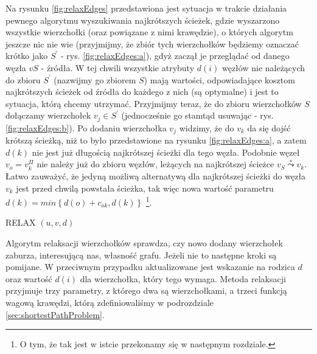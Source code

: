 Na rysunku \ref{fig:relaxEdges} przedstawiona jest sytuacja w trakcie działania pewnego algorytmu wyszukiwania najkrótszych ścieżek, gdzie wyszarzono wszystkie wierzchołki (oraz powiązane z nimi krawędzie), o których algorytm jeszcze nic nie wie (przyjmijmy, że zbiór tych wierzchołków będziemy oznaczać krótko jako $S^{'}$ - rys. \ref{fig:relaxEdges:a}), gdyż zaczął je przeglądać od danego węzła $v{S}$ - źródła. W tej chwili wszystkie atrybuty $d \left( i \right)$ węzłów nie należących do zbioru $S^{'}$ (nazwijmy go zbiorem $S$) mają wartości, odpowiadające kosztom najkrótszych ścieżek od źródła do każdego z nich (są optymalne) i jest to sytuacja, którą chcemy utrzymać. Przyjmijmy teraz, że do zbioru wierzchołków $S$ dołączamy wierzchołek $v_{j} \in S^{'}$ (jednocześnie go stamtąd usuwając - rys. \ref{fig:relaxEdges:b}). Po dodaniu wierzchołka $v_{j}$ widzimy, że do $v_{k}$ da się dojść krótszą ścieżką, niż to było przedstawione na rysunku \ref{fig:relaxEdges:a}, a zatem $d \left( k \right)$ nie jest już długością najkrótszej ścieżki dla tego węzła. Podobnie węzeł $v_{o} = v_{k}^{\Pi}$ nie należy już do zbioru węzłów, leżących na najkrótszej ścieżce $v_{S} \overset{*}\leadsto v_{k}$. Łatwo zauważyć, że jedyną możliwą alternatywą dla najkrótszej ścieżki do węzła $v_{k}$ jest przed chwilą powstała ścieżka, tak więc nowa wartość parametru $d \left( k \right) = min \left\{ d \left( o \right) + c_{ok}, d \left( k \right) \right\} $ \footnote{O tym, że tak jest w istcie przekonamy się w następnym rozdziale.}.

\begin{algorithm}[!htbp]
\DontPrintSemicolon
{}
\caption{RELAX $\left( u, v, d \right)$ \label{alg:relax}}
\end{algorithm}

Algorytm relaksacji wierzchołków sprawdza, czy nowo dodany wierzchołek zaburza, interesującą nas, własność grafu. Jeżeli nie to następne kroki są pomijane. W przeciwnym przypadku aktualizowane jest wskazanie na rodzica $d$ oraz wartość $d \left( i \right)$  dla wierzchołka, który tego wymaga. Metoda relaksacji przyjmuje trzy parametry, z którego dwa są wierzchołkami, a trzeci funkcją wagową krawędzi, którą zdefiniowaliśmy w podrozdziale \ref{sec:shortestPathProblem}.

